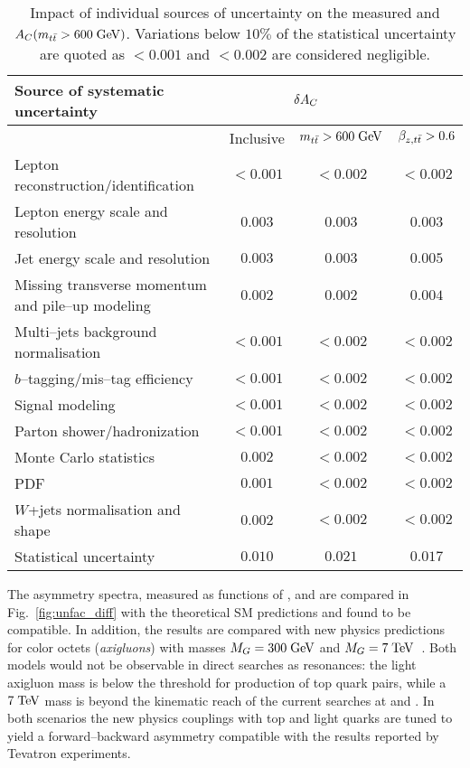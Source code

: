 \begin{table}[!htb]\centering
\begin{tabular}{l c c c}
\toprule
Source of systematic uncertainty  & \multicolumn{2}{c}{$\delta{\ensuremath{A_C}{}}$} \\
\midrule
  & Inclusive & $m_{t\bar{t}}{} >600\; \mathrm{GeV}{}$ & $\beta_{z,t\bar{t}}{}>0.6$ \\
\midrule
Lepton reconstruction/identification    & $<0.001$ & $<0.002$ & $<0.002$\\
Lepton energy scale and resolution      & $0.003$    & $0.003$   &  $0.003$\\
Jet energy scale and resolution             & $0.003$    & $0.003$   &
$0.005$ \\
Missing transverse momentum and pile--up modeling & $0.002$ & $0.002$
& $0.004$\\
Multi--jets background normalisation    & $<0.001$ & $<0.002$ & $<0.002$\\
$b$--tagging/mis--tag efficiency         & $<0.001$  & $<0.002$ & $<0.002$\\
Signal modeling                                       & $<0.001$ &
$<0.002$ & $<0.002$\\
Parton shower/hadronization             & $<0.001$  & $<0.002$ & $<0.002$\\
Monte Carlo statistics                         & $0.002$  & $<0.002$ & $<0.002$\\
PDF                                                      & $0.001$  & $<0.002$  & $<0.002$\\
$W$+jets normalisation and shape     & $0.002$  & $<0.002$ & $<0.002$\\
\midrule
Statistical uncertainty                          & $0.010$ & $0.021$ & $0.017$\\
\bottomrule
\end{tabular}
\caption{Impact of individual sources of uncertainty on the measured
  \ac{} and $A_C{}(m_{t\bar{t}}{}>600 \; \mathrm{GeV}{})$. Variations below $10\%$ of the
  statistical uncertainty are quoted as $<0.001$ and $<0.002$ are
  considered negligible.}
\label{tab:systematics}
\end{table}

The asymmetry spectra, measured as functions of
\mtt{}, \pttt{} and \ytt{} are compared in Fig.~\ref{fig:unfac_diff}
with the theoretical SM predictions and found to be compatible. 
In addition, the results are compared with new physics predictions for
color octets ({\it axigluons}) with masses $M_G=300 \; \mathrm{GeV}{}$ and $M_G=7
\; \mathrm{TeV}{}$~\cite{AguilarSaavedra:2011ci}. Both models would not
be observable in direct searches as \ttbar{} resonances: the light
axigluon mass is below the threshold for production of top quark
pairs, while a $7 \; \mathrm{TeV}$ mass is beyond the kinematic reach of the
current searches at \seventev{} and \eighttev{}. In both scenarios
the new physics couplings with top and light quarks are tuned to yield a
forward--backward asymmetry compatible with the results reported by
Tevatron experiments.

